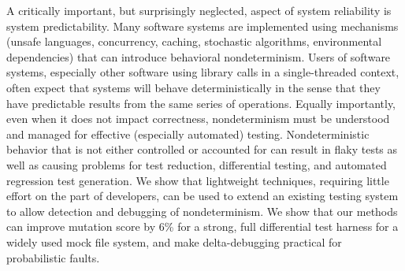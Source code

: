 A critically important, but surprisingly neglected, aspect of system reliability is system predictability.  Many software systems are implemented using mechanisms (unsafe languages, concurrency, caching, stochastic algorithms, environmental dependencies) that can introduce behavioral nondeterminism.  Users of software systems, especially other software using library calls in a single-threaded context, often expect that systems will behave deterministically in the sense that they have predictable results from the same series of operations.  Equally importantly, even when it does not impact correctness, nondeterminism must be understood and managed for effective (especially automated) testing.  Nondeterministic behavior that is not either controlled or accounted for can result in flaky tests as well as causing problems for test reduction, differential testing, and automated regression test generation.  We show that lightweight techniques, requiring little effort on the part of developers, can be used to extend an existing testing system to allow detection and debugging of nondeterminism.  We show that our methods can improve mutation score by 6\% for a strong, full differential test harness for a widely used mock file system, and make delta-debugging practical for probabilistic faults.
